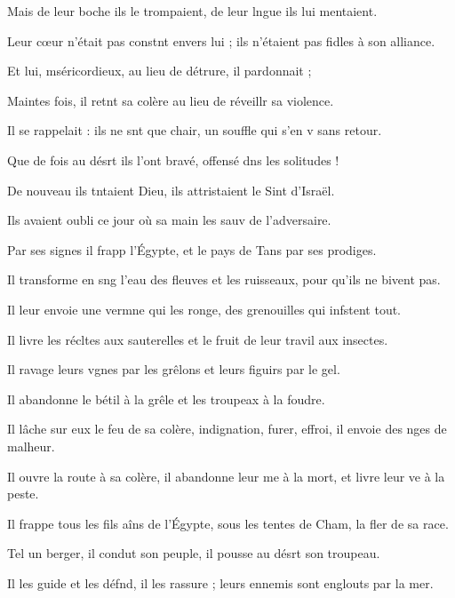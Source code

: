 \item Mais de leur boche ils le trompaient, de leur lngue ils lui mentaient.
\item Leur cœur n’était pas constnt envers lui ; ils n’étaient pas fidles à son alliance.
\item Et lui, mséricordieux, au lieu de détrure, il pardonnait ; 
\item Maintes fois, il retnt sa colère au lieu de réveillr sa violence.
\item Il se rappelait : ils ne snt que chair, un souffle qui s’en v sans retour.
\item Que de fois au désrt ils l’ont bravé, offensé dns les solitudes !
\item De nouveau ils tntaient Dieu, ils attristaient le Sint d’Israël.
\item Ils avaient oubli ce jour où sa main les sauv de l’adversaire.
\item Par ses signes il frapp l’Égypte, et le pays de Tans par ses prodiges.
\item Il transforme en sng l’eau des fleuves et les ruisseaux, pour qu’ils ne bivent pas.
\item Il leur envoie une vermne qui les ronge, des grenouilles qui infstent tout.
\item Il livre les récltes aux sauterelles et le fruit de leur travil aux insectes.
\item Il ravage leurs vgnes par les grêlons et leurs figuirs par le gel.
\item Il abandonne le bétil à la grêle et les troupeax à la foudre.
\item Il lâche sur eux le feu de sa colère, indignation, furer, effroi, il envoie des nges de malheur.
\item Il ouvre la route à sa colère, il abandonne leur me à la mort, et livre leur ve à la peste.
\item Il frappe tous les fils aîns de l’Égypte, sous les tentes de Cham, la fler de sa race.
\item Tel un berger, il condut son peuple, il pousse au désrt son troupeau.
\item Il les guide et les défnd, il les rassure ; leurs ennemis sont englouts par la mer.
